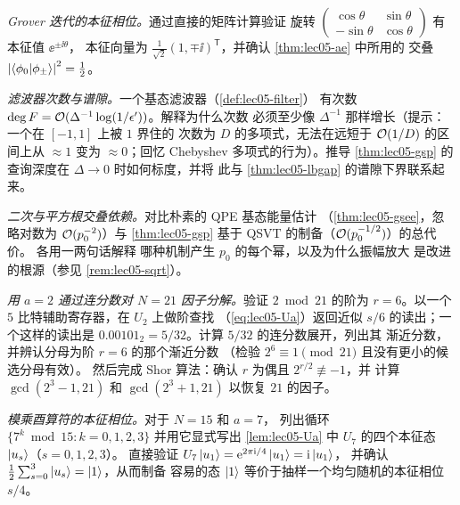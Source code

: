 \begin{exercise}\label{ex:lec05-4}
\emph{Grover 迭代的本征相位。}通过直接的矩阵计算验证
旋转 $\left(\begin{smallmatrix}\cos\theta&\sin\theta\\-\sin\theta&
\cos\theta\end{smallmatrix}\right)$ 有本征值 $\ee^{\pm\ii\theta}$，
本征向量为 $\tfrac{1}{\sqrt2}(1,\mp\ii)^{\mathsf T}$，并确认 \cref{thm:lec05-ae} 中所用的
交叠 $\left\lvert \braket{\phi_0|\phi_\pm} \right\rvert^2=\tfrac12$。
\end{exercise}

\begin{exercise}\label{ex:lec05-5}
\emph{滤波器次数与谱隙。}一个基态滤波器（\cref{def:lec05-filter}）
有次数 $\deg F=\mathcal{O}(\Delta^{-1}\log(1/\epsilon'))$。解释为什么次数
必须至少像 $\Delta^{-1}$ 那样增长（提示：一个在 $[-1,1]$ 上被 $1$ 界住的
次数为 $D$ 的多项式，无法在远短于 $\mathcal{O}(1/D)$ 的区间上从 $\approx1$ 变为
$\approx0$；回忆 Chebyshev 多项式的行为）。推导
\cref{thm:lec05-gsp} 的查询深度在 $\Delta\to0$ 时如何标度，并将
此与 \cref{thm:lec05-lbgap} 的谱隙下界联系起来。
\end{exercise}

\begin{exercise}\label{ex:lec05-6}
\emph{二次与平方根交叠依赖。}对比朴素的 QPE 基态能量估计
（\cref{thm:lec05-gsee}，忽略对数为 $\mathcal{O}(p_0^{-2})$）与
\cref{thm:lec05-gsp} 基于 QSVT 的制备（$\mathcal{O}(p_0^{-1/2})$）的总代价。
各用一两句话解释
哪种机制产生 $p_0$ 的每个幂，以及为什么振幅放大
是改进的根源（参见 \cref{rem:lec05-sqrt}）。
\end{exercise}

\begin{exercise}\label{ex:lec05-7}
\emph{用 $a=2$ 通过连分数对 $N=21$ 因子分解。}验证
$2\bmod 21$ 的阶为 $r=6$。以一个 $5$ 比特辅助寄存器，在 $U_2$ 上做阶查找
（\cref{eq:lec05-Ua}）返回近似 $s/6$ 的读出；一个这样的读出是
$0.00101_2=5/32$。计算 $5/32$ 的连分数展开，列出其
渐近分数，并辨认分母为阶 $r=6$ 的那个渐近分数
（检验 $2^{6}\equiv1\pmod{21}$ 且没有更小的候选分母有效）。
然后完成 Shor 算法：确认 $r$ 为偶且 $2^{r/2}\not\equiv-1$，并
计算 $\gcd(2^{3}-1,21)$ 和 $\gcd(2^{3}+1,21)$ 以恢复 $21$ 的因子。
\end{exercise}

\begin{exercise}\label{ex:lec05-8}
\emph{模乘酉算符的本征相位。}对于 $N=15$ 和 $a=7$，
列出循环 $\{7^{k}\bmod 15:k=0,1,2,3\}$ 并用它显式写出
\cref{lem:lec05-Ua} 中 $U_7$ 的四个本征态 $\ket{u_s}$（$s=0,1,2,3$）。
直接验证 $U_7\ket{u_1}=\mathrm{e}^{2\pi\mathrm{i}/4}\ket{u_1}=\mathrm{i}\ket{u_1}$，
并确认 $\tfrac12\sum_{s=0}^{3}\ket{u_s}=\ket{1}$，从而制备
容易的态 $\ket{1}$ 等价于抽样一个均匀随机的本征相位
$s/4$。
\end{exercise}

